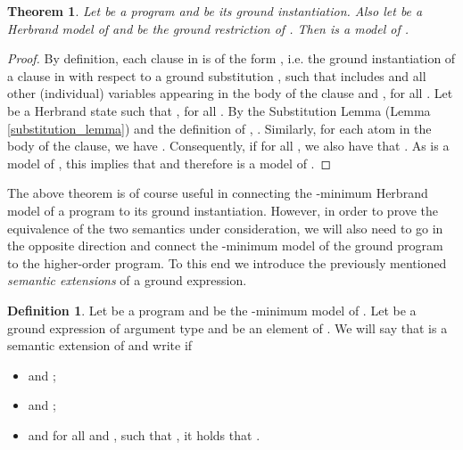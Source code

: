 \documentclass[submission,copyright]{eptcs}
\newtheorem{theorem}{Theorem}
\theoremstyle{definition}
\newtheorem{definition}{Definition}
\begin{document}
\begin{theorem}
\label{th_ground_model}
Let  be a program and  be its ground instantiation.
Also let  be a Herbrand model of  and  be the ground restriction of . Then  is a model of .
\end{theorem}
\begin{proof}
By definition, each clause in  is of the form
, i.e. the ground instantiation of a clause  in  with respect to a ground substitution , such that  includes  and all other (individual) variables appearing in the body of the clause and , for all .
Let  be a Herbrand state such that ,
for all . By the Substitution Lemma (Lemma \ref{substitution_lemma})
and the definition of ,
.
Similarly, for each atom  in the body of the clause,
we have .
Consequently, if  for all , we also have that .
As  is a model of , this implies that
 and
therefore  is a model of .
\end{proof}

{The above theorem is of course useful in connecting the
-minimum Herbrand model of a program to its ground instantiation. However,
in order to prove the equivalence of the two semantics under consideration,
we will also need to go in the opposite direction and connect the -minimum model of the ground program to the higher-order program. To this end we
introduce the previously mentioned \emph{semantic extensions} of a ground
expression.}
\begin{definition}
Let  be a program and  be the -minimum model of .
Let  be a ground expression of argument type  and  be an
element of . We will say that  is a semantic extension of  and
write  if
\begin{itemize}
\item  and ;
\item  and ;
\item  and for all  and ,
      such that , it holds that .
\end{itemize}
\end{definition}
\end{document}
